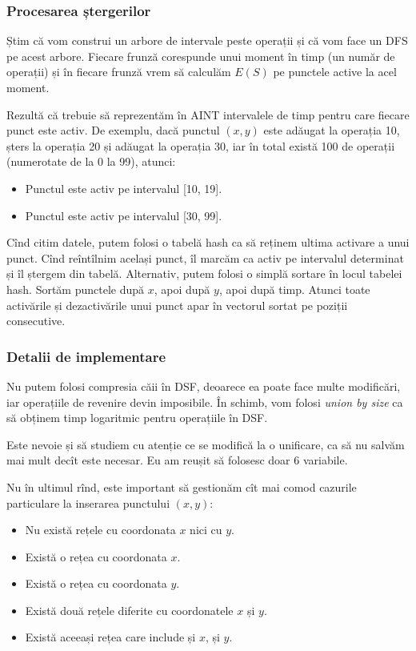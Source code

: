\subsubsection*{Procesarea ștergerilor}

Știm că vom construi un arbore de intervale peste operații și că vom face un DFS pe acest arbore. Fiecare frunză corespunde unui moment în timp (un număr de operații) și în fiecare frunză vrem să calculăm $E(S)$ pe punctele active la acel moment.

Rezultă că trebuie să reprezentăm în AINT intervalele de timp pentru care fiecare punct este activ. De exemplu, dacă punctul $(x,y)$ este adăugat la operația 10, șters la operația 20 și adăugat la operația 30, iar în total există 100 de operații (numerotate de la 0 la 99), atunci:

\begin{itemize}
  \item Punctul este activ pe intervalul [10, 19].
  \item Punctul este activ pe intervalul [30, 99].
\end{itemize}

Cînd citim datele, putem folosi o tabelă hash ca să reținem ultima activare a unui punct. Cînd reîntîlnim același punct, îl marcăm ca activ pe intervalul determinat și îl ștergem din tabelă. Alternativ, putem folosi o simplă sortare în locul tabelei hash. Sortăm punctele după $x$, apoi după $y$, apoi după timp. Atunci toate activările și dezactivările unui punct apar în vectorul sortat pe poziții consecutive.

\subsubsection*{Detalii de implementare}

Nu putem folosi compresia căii în DSF, deoarece ea poate face multe modificări, iar operațiile de revenire devin imposibile. În schimb, vom folosi \textit{union by size} ca să obținem timp logaritmic pentru operațiile în DSF.

Este nevoie și să studiem cu atenție ce se modifică la o unificare, ca să nu salvăm mai mult decît este necesar. Eu am reușit să folosesc doar 6 variabile.

Nu în ultimul rînd, este important să gestionăm cît mai comod cazurile particulare la inserarea punctului $(x, y)$:

\begin{itemize}
  \item Nu există rețele cu coordonata $x$ nici cu $y$.

  \item Există o rețea cu coordonata $x$.

  \item Există o rețea cu coordonata $y$.

  \item Există două rețele diferite cu coordonatele $x$ și $y$.

  \item Există aceeași rețea care include și $x$, și $y$.
\end{itemize}

